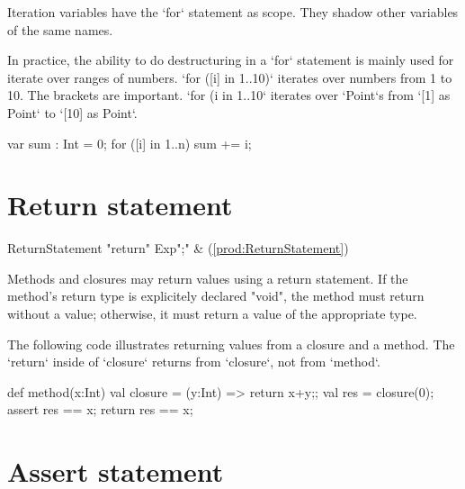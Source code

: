 Iteration variables have the \xcd`for` statement as scope.  They shadow other
variables of the same names.

\begin{ex}
In practice, the ability to do destructuring in a \xcd`for` statement is
mainly used for iterate over ranges of numbers.  
\xcd`for ([i] in 1..10)` iterates over numbers from 1 to 10.
The brackets are important. 
\xcd`for (i in 1..10` iterates over \xcd`Point`s from 
\xcd`[1] as Point` to \xcd`[10] as Point`.


\begin{xten}
  var sum : Int = 0;
  for ([i] in 1..n) sum += i;
\end{xten}
\end{ex}


\section{Return statement}
\label{ReturnStatement}

\begin{bbgrammar}
     ReturnStatement \: \xcd"return" Exp\opt \xcd";" & (\ref{prod:ReturnStatement}) \\
\end{bbgrammar}

Methods and closures may return values using a return statement.
If the method's return type is explicitely declared \xcd"void",
the method must return without a value; otherwise, it must return
a value of the appropriate type.

\begin{ex}
The following code illustrates returning values from a closure and a method.
The \xcd`return` inside of \xcd`closure` returns from \xcd`closure`, not from
\xcd`method`.  
\begin{xten}
def method(x:Int) {
  val closure = (y:Int) => {return x+y;}; 
  val res = closure(0);
  assert res == x;
  return res == x;
}
\end{xten}


\end{ex}


\section{Assert statement} 


